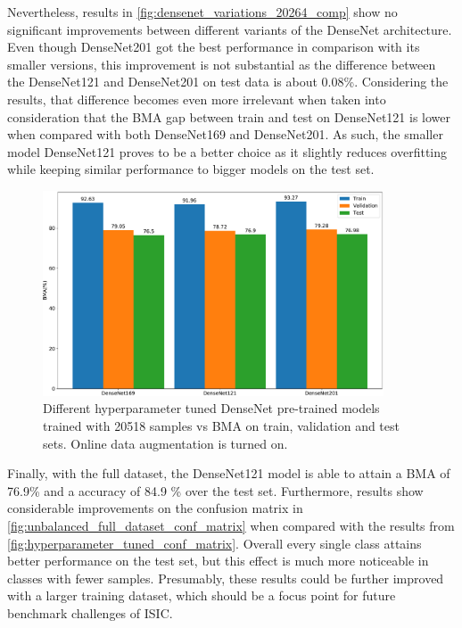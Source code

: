     Nevertheless, results in \autoref{fig:densenet_variations_20264_comp} show no significant improvements between different variants of the DenseNet architecture. Even though DenseNet201 got the best performance in comparison with its smaller versions, this improvement is not substantial as the difference between the DenseNet121 and DenseNet201 on test data is about 0.08\%. Considering the results, that difference becomes even more irrelevant when taken into consideration that the \ac{BMA} gap between train and test on DenseNet121 is lower when compared with both DenseNet169 and DenseNet201. As such, the smaller model DenseNet121 proves to be a better choice as it slightly reduces overfitting while keeping similar performance to bigger models on the test set. \par
    
    \begin{figure}[ht]
        \centering
        \includegraphics[width=0.9\textwidth]{figs/densenet_variations_20264_comp.pdf}
        \caption[Different hyperparameter tuned DenseNet pre-trained models trained with 20518 samples vs \ac{BMA} on train, validation and test sets]{Different hyperparameter tuned DenseNet pre-trained models trained with 20518 samples vs \ac{BMA} on train, validation and test sets. Online data augmentation is turned on.}
        \label{fig:densenet_variations_20264_comp}
    \end{figure}
    
    Finally, with the full dataset, the DenseNet121 model is able to attain a \ac{BMA} of 76.9\% and a accuracy of 84.9 \% over the test set. Furthermore, results show considerable improvements on the confusion matrix in \autoref{fig:unbalanced_full_dataset_conf_matrix} when compared with the results from \autoref{fig:hyperparameter_tuned_conf_matrix}. Overall every single class attains better performance on the test set, but this effect is much more noticeable in classes with fewer samples. Presumably, these results could be further improved with a larger training dataset, which should be a focus point for future benchmark challenges of \ac{ISIC}. \par
    
